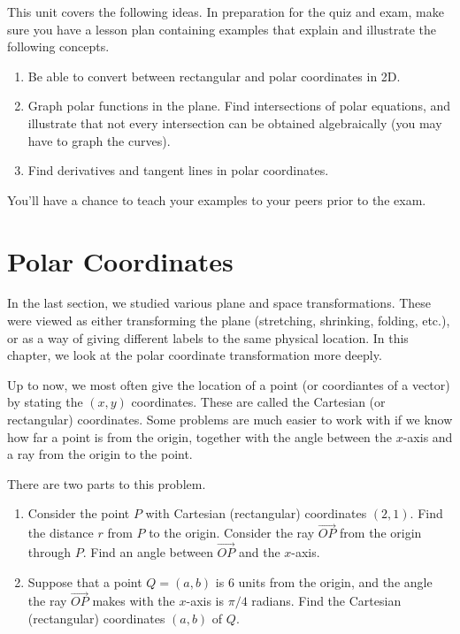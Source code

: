 
\noindent 
This unit covers the following ideas. In preparation for the quiz and exam, make sure you have a lesson plan containing examples that explain and illustrate the following concepts.  
\begin{enumerate}

\item Be able to convert between rectangular and polar coordinates in 2D.
\item Graph polar functions in the plane. Find intersections of polar equations, and illustrate that not every intersection can be obtained algebraically (you may have to graph the curves).
\item Find derivatives and tangent lines in polar coordinates.

\end{enumerate}
You'll have a chance to teach your examples to your peers prior to the exam.

\section{Polar Coordinates}
%
In the last section, we studied various plane and space transformations.  These were viewed as either transforming the plane (stretching, shrinking, folding, etc.), or as a way of giving different labels to the same physical location.  In this chapter, we look at the polar coordinate transformation more deeply.

Up to now, we most often give the location of a point (or coordiantes of a vector) by stating the $(x,y)$ coordinates.  These are called the Cartesian (or rectangular) coordinates.  Some problems are much easier to work with if we know how far a point is from the origin, together with the angle between the $x$-axis and a ray from the origin to the point.

\begin{problem}
There are two parts to this problem.
\begin{enumerate}
\item Consider the point $P$ with Cartesian (rectangular) coordinates $(2,1)$.  Find the distance $r$ from $P$ to the origin. Consider the ray $\vec {OP}$ from the origin through $P$. Find an angle between $\vec{OP}$ and the $x$-axis. 

\item Suppose that a point $Q=(a,b)$ is 6 units from the origin, and the angle the ray $\vec {OP}$ makes with the $x$-axis is $\pi/4$ radians.  Find the Cartesian (rectangular) coordinates $(a,b)$ of $Q$.
\end{enumerate}

 
\end{problem}

